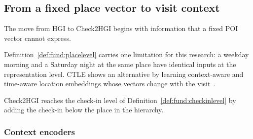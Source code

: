 
\subsection{From a fixed place vector to visit context}

The move from HGI to Check2HGI begins with information that a fixed POI vector cannot
express.

Definition~\ref{def:fund:placelevel} carries one limitation for this research: a
weekday morning and a Saturday night at the same place have identical inputs at the
representation level. CTLE shows an alternative by learning context-aware and
time-aware location embeddings whose vectors change with the
visit~\cite{lin2021ctle}.

Check2HGI reaches the check-in level of Definition~\ref{def:fund:checkinlevel} by
adding the check-in below the place in the hierarchy.

\subsubsection{Context encoders}

